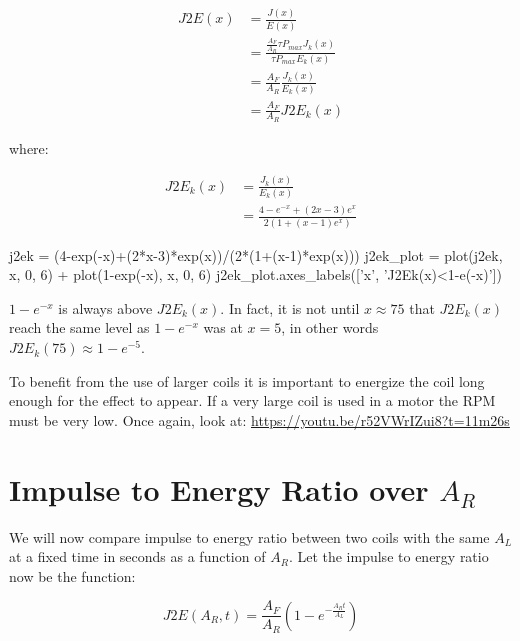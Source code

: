 \documentclass[]{../common/elementary-physics}
\begin{document}
\begin{subequations}
\begin{align}
J2E(x) &= \frac{J(x)}{E(x)} \\
&= \frac{\frac{A_F}{A_R} \tau P_{max} J_k(x)}{\tau P_{max} E_k(x)} \\
&= \frac{A_F}{A_R} \frac{J_k(x)}{E_k(x)} \\
&= \frac{A_F}{A_R} J2E_k(x)
\end{align}
\end{subequations}

where:

\begin{subequations}
\begin{align}
J2E_k(x) &= \frac{J_k(x)}{E_k(x)} \\
&= \frac{4-e^{-x}+(2x-3)e^x}{2(1+(x-1)e^x)}
\end{align}
\end{subequations}

\begin{sagesilent}
j2ek = (4-exp(-x)+(2*x-3)*exp(x))/(2*(1+(x-1)*exp(x)))
j2ek_plot = plot(j2ek, x, 0, 6) + plot(1-exp(-x), x, 0, 6)
j2ek_plot.axes_labels(['x', 'J2Ek(x)<1-e(-x)'])
\end{sagesilent}


$1-e^{-x}$ is always above $J2E_k(x)$.
In fact, it is not until $x \approx 75$ that $J2E_k(x)$ reach the same level as $1-e^{-x}$ was at $x = 5$, in other words $J2E_k(75) \approx 1-e^{-5}$.

To benefit from the use of larger coils it is important to energize the coil long enough for the effect to appear.
If a very large coil is used in a motor the RPM must be very low.
Once again, look at: \url{https://youtu.be/r52VWrIZui8?t=11m26s}

\section{Impulse to Energy Ratio over $A_R$}

We will now compare impulse to energy ratio between two coils with the same $A_L$ at a fixed time in seconds as a function of $A_R$. Let the impulse to energy ratio now be the function:

\begin{equation}
J2E(A_R,t) = \frac{A_F}{A_R} (1 - e^{- \frac{A_R t}{A_L}})
\end{equation}
\end{document}
